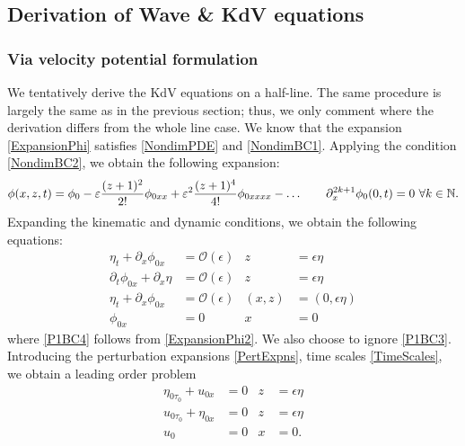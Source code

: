 \documentclass[10pt,reqno,oneside,a4paper]{article}
\begin{document}
\subsection{Derivation of Wave \& KdV equations}

\subsubsection{Via velocity potential formulation}
We tentatively derive the KdV equations on a half-line. The same procedure is largely the same as in the previous section; thus, we only comment where the derivation differs from the whole line case. We know that the expansion \eqref{ExpansionPhi} satisfies \eqref{NondimPDE} and \eqref{NondimBC1}. Applying the condition \eqref{NondimBC2}, we obtain the following expansion:
\begin{equation}\label{ExpansionPhi2}
\phi(x,z,t) = \phi_0 - \varepsilon\frac{(z+1)^2}{2!}\phi_{0xx} + \varepsilon^2 \frac{(z+1)^4}{4!}\phi_{0xxxx} - \ldots \qquad \partial_x^{2k+1}\phi_0(0,t) = 0 ~\forall k \in \mathbb N.
\end{equation}
Expanding the kinematic and dynamic conditions, we obtain the following equations:
\begin{subequations} \label{NonDimHalfLineProb1}
\begin{align}
\label{P1BC1}\eta_t + \partial_x\phi_{0x} &= \mathcal{O}(\epsilon) &z &= \epsilon\eta \\
\label{P1BC2}\partial_t\phi_{0x} + \partial_x \eta &=  \mathcal{O}(\epsilon) &z &= \epsilon\eta  \\
\label{P1BC3}\eta_t + \partial_x\phi_{0x} &= \mathcal{O}(\epsilon) &(x,z) &= (0,\epsilon\eta) \\
\label{P1BC4}\phi_{0x} &= 0 &x &= 0
\end{align}
\end{subequations}
where \eqref{P1BC4} follows from \eqref{ExpansionPhi2}. We also choose to ignore \eqref{P1BC3}. Introducing the perturbation expansions \eqref{PertExpns}, time scales \eqref{TimeScales}, we obtain a leading order problem
\begin{subequations} \label{NonDimHalfLineProb2}
\begin{align}
\label{P2BC1}\eta_{0\tau_0} + u_{0x} &=0 &z &= \epsilon\eta \\
\label{P2BC2} u_{0\tau_0} + \eta_{0x} &= 0 &z &= \epsilon\eta  \\
\label{P2BC3} u_0 &= 0 &x &= 0.
\end{align}
\end{subequations}
\end{document}
